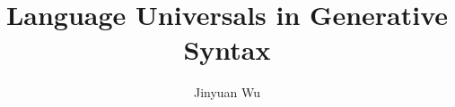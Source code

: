 \documentclass[a4paper]{article}
\title{Language Universals in Generative Syntax}
\author{Jinyuan Wu}
\begin{document}
\maketitle

\cite{biberauer2017final}



\end{document}
